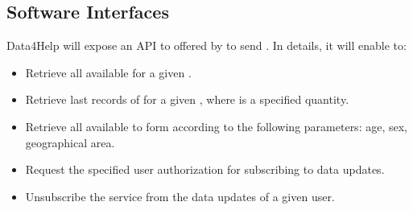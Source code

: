 \documentclass[../../../rasd.tex]{subfiles}
\begin{document}
\subsection{Software Interfaces}
			Data4Help will expose an API to  offered by  to send . In details, it will enable to:
			\begin{itemize}
				\item Retrieve all  available for a given .
				\item Retrieve last  records of  for a given , where  is a specified quantity.
				\item Retrieve all  available to form  according to the following parameters: age, sex, geographical area.
				\item Request the specified user authorization for subscribing to data updates.
				\item Unsubscribe the service from the data updates of a given user.
			\end{itemize}
\end{document}
